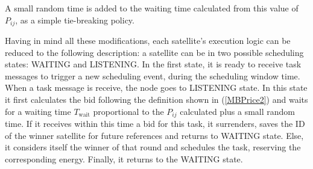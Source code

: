 A small random time is added to the waiting time calculated from this value of $P_{ij}$, as a simple tie-breaking policy.

Having in mind all these modifications, each satellite's execution logic can be reduced to the following description: a satellite can be in two possible scheduling states: WAITING and LISTENING. In the first state, it is ready to receive task messages to trigger a new scheduling event, during the scheduling window time. When a task message is receive, the node goes to LISTENING state. In this state it first calculates the bid following the definition shown in (\ref{MBPrice2}) and waits for a waiting time $T_\text{wait}$ proportional to the $P_{ij}$ calculated plus a small random time. If it receives within this time a bid for this task, it surrenders, saves the ID of the winner satellite for future references and returns to WAITING state. Else, it considers itself the winner of that round and schedules the task, reserving the corresponding energy. Finally, it returns to the WAITING state.